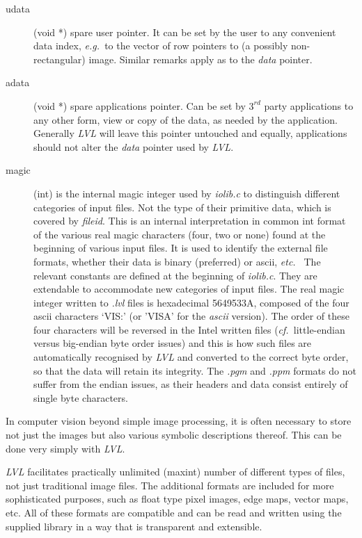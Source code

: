 \documentclass[11pt,twoside,english,a4paper]{article}
\def\etc{\emph{etc.~}}
\def\cf{\emph{cf.~}\ignorespaces}          %
\def\eg{\emph{e.g.~}\ignorespaces}        %
\begin{document}
\begin{description}
\item[udata] (void *) spare user pointer. It  can be set by the user to any convenient data index,
\eg to the vector of row pointers to (a possibly non-rectangular) image. Similar remarks apply
as to the \emph{data} pointer.

\item[adata] (void *) spare applications pointer. Can be set by $3^{rd}$ party applications to any 
other form, view or copy of the data, as needed by the application. Generally \emph{LVL} will leave
this pointer untouched and equally,  applications should not alter the  \emph{data} pointer 
used by \emph{LVL}.

\item[magic] (int) is the internal magic integer used by \emph{iolib.c} to distinguish different
categories of input files. Not the type of their primitive data, which is covered by \emph{fileid}.
This is an internal interpretation in common int format of the various real
magic characters (four, two or none) found at the beginning of various input files. 
It is used to identify the external file formats, whether their data is binary (preferred) or ascii, \etc
The relevant constants are defined at the beginning of \emph{iolib.c}. 
They are extendable to accommodate new categories of input files.
The real magic integer written to \emph{.lvl} files is hexadecimal 5649533A, composed of the four ascii
characters `VIS:' (or 'VISA' for the \emph{ascii} version). The order of these four characters will be reversed
in the Intel written files (\cf little-endian versus big-endian byte order
issues) and this is how such files are automatically recognised
by \emph{LVL} and  converted to the correct byte order, so that the data will retain its integrity.
The \emph{.pgm} and \emph{.ppm} formats do not suffer from the endian issues,
as their headers and data consist entirely of single byte characters.
\end{description}
In computer vision beyond simple image processing, it is often necessary to store not just the images
but also various symbolic descriptions thereof. 
This can be done very simply with \emph{LVL}.

\emph{LVL} facilitates practically unlimited (maxint) number of
different types of files, not just traditional image files.
The additional formats are included for more sophisticated purposes,
such as float type pixel images, edge maps, vector maps, etc. All
of these formats are compatible and can be read and written using
the supplied library in a way that is transparent and extensible.
\end{document}
